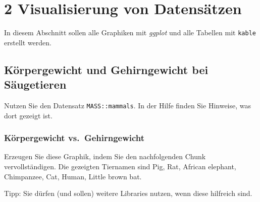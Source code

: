 \documentclass[
]{article}
\begin{document}
\hypertarget{visualisierung-von-datensuxe4tzen}{%
\section{2 Visualisierung von
Datensätzen}\label{visualisierung-von-datensuxe4tzen}}

In diesem Abschnitt sollen alle Graphiken mit \emph{ggplot} und alle
Tabellen mit \texttt{kable} erstellt werden.

\hypertarget{kuxf6rpergewicht-und-gehirngewicht-bei-suxe4ugetieren}{%
\subsection{Körpergewicht und Gehirngewicht bei
Säugetieren}\label{kuxf6rpergewicht-und-gehirngewicht-bei-suxe4ugetieren}}

Nutzen Sie den Datensatz \texttt{MASS::mammals}. In der Hilfe finden Sie
Hinweise, was dort gezeigt ist.

\hypertarget{kuxf6rpergewicht-vs.-gehirngewicht}{%
\subsubsection{Körpergewicht
vs.~Gehirngewicht}\label{kuxf6rpergewicht-vs.-gehirngewicht}}

Erzeugen Sie diese Graphik, indem Sie den nachfolgenden Chunk
vervollständigen. Die gezeigten Tiernamen sind Pig, Rat, African
elephant, Chimpanzee, Cat, Human, Little brown bat.

Tipp: Sie dürfen (und sollen) weitere Libraries nutzen, wenn diese
hilfreich sind.
\end{document}

